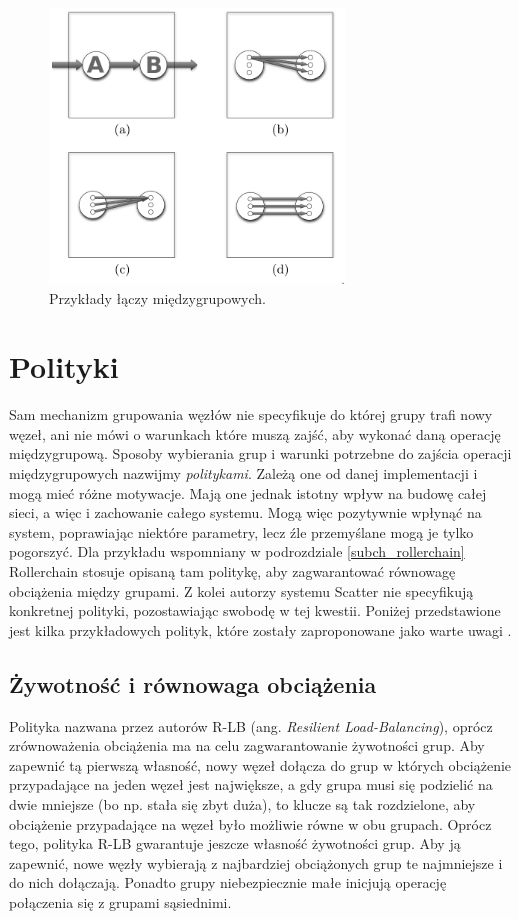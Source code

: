\documentclass[12pt, twoside, openany]{report}
\begin{document}
\begin{figure}[H]
\centering
\includegraphics[width=0.7\textwidth,height=\textheight,keepaspectratio]{links.png}
\caption{Przykłady łączy międzygrupowych.}
\label{fig:links}
\end{figure}


\section{Polityki}

Sam mechanizm grupowania węzłów nie specyfikuje do której grupy trafi nowy węzeł, ani nie mówi o warunkach które muszą zajść, aby wykonać daną operację międzygrupową. Sposoby wybierania grup i warunki potrzebne do zajścia operacji międzygrupowych nazwijmy \textit{politykami}. Zależą one od danej implementacji i mogą mieć różne motywacje. Mają one jednak istotny wpływ na budowę całej sieci, a więc i zachowanie całego systemu. Mogą więc pozytywnie wpłynąć na system, poprawiając niektóre parametry, lecz źle przemyślane mogą je tylko pogorszyć. Dla przykładu wspomniany w podrozdziale \ref{subch_rollerchain} Rollerchain stosuje opisaną tam politykę, aby zagwarantować równowagę obciążenia między grupami. Z kolei autorzy systemu Scatter nie specyfikują konkretnej polityki, pozostawiając swobodę w tej kwestii. Poniżej przedstawione jest kilka przykładowych polityk, które zostały zaproponowane jako warte uwagi \cite{bib:paiva}.

\subsection{Żywotność i równowaga obciążenia}
Polityka nazwana przez autorów R-LB (ang. \textit{Resilient Load-Balancing}), oprócz zrównoważenia obciążenia ma na celu zagwarantowanie żywotności grup. Aby zapewnić tą pierwszą własność, nowy węzeł dołącza do grup w których obciążenie przypadające na jeden węzeł jest największe, a gdy grupa musi się podzielić na dwie mniejsze (bo np. stała się zbyt duża), to klucze są tak rozdzielone, aby obciążenie przypadające na węzeł było możliwie równe w obu grupach. Oprócz tego, polityka R-LB gwarantuje jeszcze własność żywotności grup. Aby ją zapewnić, nowe węzły wybierają z najbardziej obciążonych grup te najmniejsze i do nich dołączają. Ponadto grupy niebezpiecznie małe inicjują operację połączenia się z grupami sąsiednimi.
\end{document}
